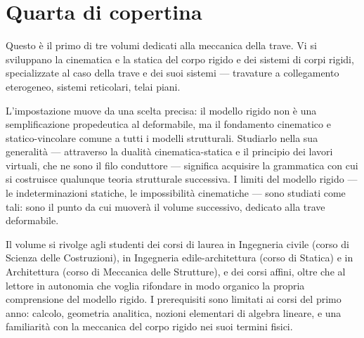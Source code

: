 
\chapter*{Quarta di copertina}
Questo è il primo di tre volumi dedicati alla meccanica della trave. Vi si sviluppano la cinematica e la statica del corpo rigido e dei sistemi di corpi rigidi, specializzate al caso della trave e dei suoi sistemi --- travature a collegamento eterogeneo, sistemi reticolari, telai piani.

L'impostazione muove da una scelta precisa: il modello rigido non è una semplificazione propedeutica al deformabile, ma il fondamento cinematico e statico-vincolare comune a tutti i modelli strutturali. Studiarlo nella sua generalità --- attraverso la dualità cinematica-statica e il principio dei lavori virtuali, che ne sono il filo conduttore --- significa acquisire la grammatica con cui si costruisce qualunque teoria strutturale successiva. I limiti del modello rigido --- le indeterminazioni statiche, le impossibilità cinematiche --- sono studiati come tali: sono il punto da cui muoverà il volume successivo, dedicato alla trave deformabile.

Il volume si rivolge agli studenti dei corsi di laurea in Ingegneria civile (corso di Scienza delle Costruzioni), in Ingegneria edile-architettura (corso di Statica) e in Architettura (corso di Meccanica delle Strutture), e dei corsi affini, oltre che al lettore in autonomia che voglia rifondare in modo organico la propria comprensione del modello rigido. I prerequisiti sono limitati ai corsi del primo anno: calcolo, geometria analitica, nozioni elementari di algebra lineare, e una familiarità con la meccanica del corpo rigido nei suoi termini fisici.